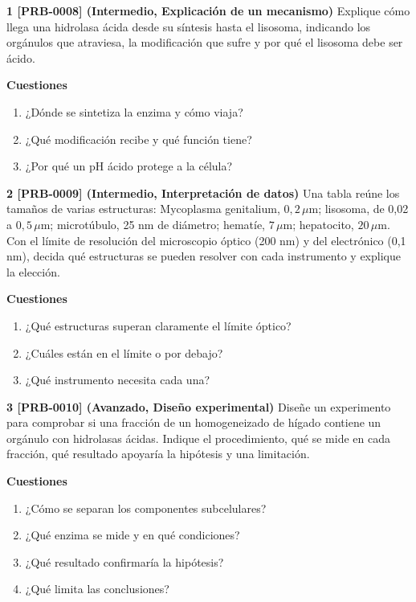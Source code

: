 \documentclass{book}
\begin{document}
\begin{tcolorbox}[title={Ejercicios}, studiumworked, breakable]

\noindent\textbf{1 [PRB-0008] (Intermedio, Explicación de un mecanismo)}
Explique cómo llega una hidrolasa ácida desde su síntesis hasta el lisosoma, indicando los orgánulos que atraviesa, la modificación que sufre y por qué el lisosoma debe ser ácido.


\noindent\textbf{Cuestiones}
\begin{enumerate}
\item ¿Dónde se sintetiza la enzima y cómo viaja?
\item ¿Qué modificación recibe y qué función tiene?
\item ¿Por qué un pH ácido protege a la célula?
\end{enumerate}

\noindent\textbf{2 [PRB-0009] (Intermedio, Interpretación de datos)}
Una tabla reúne los tamaños de varias estructuras: Mycoplasma genitalium, \(0{,}2\,\mu\mathrm{m}\); lisosoma, de 0,02 a \(0{,}5\,\mu\mathrm{m}\); microtúbulo, 25 nm de diámetro; hematíe, \(7\,\mu\mathrm{m}\); hepatocito, \(20\,\mu\mathrm{m}\). Con el límite de resolución del microscopio óptico (200 nm) y del electrónico (0,1 nm), decida qué estructuras se pueden resolver con cada instrumento y explique la elección.


\noindent\textbf{Cuestiones}
\begin{enumerate}
\item ¿Qué estructuras superan claramente el límite óptico?
\item ¿Cuáles están en el límite o por debajo?
\item ¿Qué instrumento necesita cada una?
\end{enumerate}

\noindent\textbf{3 [PRB-0010] (Avanzado, Diseño experimental)}
Diseñe un experimento para comprobar si una fracción de un homogeneizado de hígado contiene un orgánulo con hidrolasas ácidas. Indique el procedimiento, qué se mide en cada fracción, qué resultado apoyaría la hipótesis y una limitación.


\noindent\textbf{Cuestiones}
\begin{enumerate}
\item ¿Cómo se separan los componentes subcelulares?
\item ¿Qué enzima se mide y en qué condiciones?
\item ¿Qué resultado confirmaría la hipótesis?
\item ¿Qué limita las conclusiones?
\end{enumerate}


\end{tcolorbox}
\end{document}
